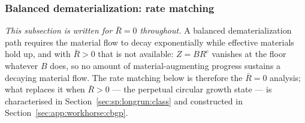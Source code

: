 \subsubsection{Balanced dematerialization: rate matching}\label{sec:app:workhorse:bdp}

\emph{This subsection is written for $\bar R=0$ throughout.} A balanced dematerialization path requires the material flow to decay exponentially while effective materials hold up, and with $\bar R>0$ that is not available: $Z=BR^e$ vanishes at the floor whatever $B$ does, so no amount of material-augmenting progress sustains a decaying material flow. The rate matching below is therefore the $\bar R=0$ analysis; what replaces it when $\bar R>0$ --- the perpetual circular growth state --- is characterised in Section~\ref{sec:sp:longrun:class} and constructed in Section~\ref{sec:app:workhorse:cbgp}.

